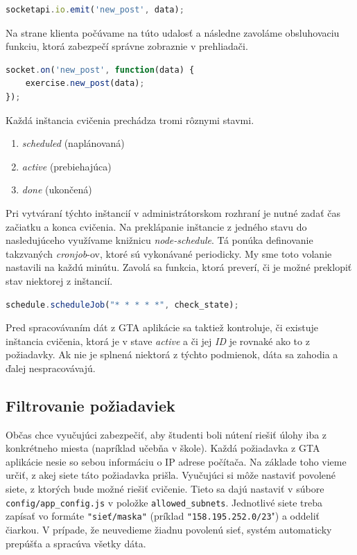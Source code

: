 \begin{lstlisting}[language=JavaScript]
socketapi.io.emit('new_post', data);
\end{lstlisting}

Na strane klienta počúvame na túto udalosť a následne zavoláme obsluhovaciu
funkciu, ktorá zabezpečí správne zobraznie v prehliadači.

\begin{lstlisting}[language=JavaScript]
socket.on('new_post', function(data) {
    exercise.new_post(data);
});
\end{lstlisting}

Každá inštancia cvičenia prechádza tromi rôznymi stavmi.
\begin{enumerate}
	\item \textit{scheduled} (naplánovaná)
	\item \textit{active} (prebiehajúca)
	\item \textit{done} (ukončená)
\end{enumerate}

Pri vytváraní týchto inštancií v administrátorskom rozhraní je nutné zadať
čas začiatku a konca cvičenia. Na preklápanie inštancie z jedného stavu do nasledujúceho
využívame knižnicu \textit{node-schedule}. Tá ponúka definovanie takzvaných
\textit{cronjob}-ov, ktoré sú vykonávané periodicky. My sme toto volanie nastavili
na každú minútu. Zavolá sa funkcia, ktorá preverí, či je možné preklopiť stav
niektorej z inštancií.

\begin{lstlisting}[language=JavaScript]
schedule.scheduleJob("* * * * *", check_state);
\end{lstlisting}

Pred spracovávaním dát z GTA aplikácie sa taktiež kontroluje, či existuje inštancia
cvičenia, ktorá je v stave \textit{active} a či jej \textit{ID} je rovnaké
ako to z požiadavky. Ak nie je splnená niektorá z týchto podmienok, dáta sa
zahodia a ďalej nespracovávajú.

\subsection{Filtrovanie požiadaviek}
\label{sec:gtadataprocessing:ipfilter}

Občas chce vyučujúci zabezpečiť, aby študenti boli nútení riešiť úlohy
iba z konkrétneho miesta (napríklad učebňa v škole). Každá požiadavka z GTA aplikácie
nesie so sebou informáciu o IP adrese počítača. Na základe toho vieme určiť,
z akej siete táto požiadavka prišla. Vyučujúci si môže nastaviť povolené siete,
z ktorých bude možné riešiť cvičenie. Tieto sa dajú nastaviť v súbore
\verb'config/app_config.js' v položke \verb'allowed_subnets'.
Jednotlivé siete treba zapísať vo formáte \verb'"sieť/maska"'
(príklad \verb'"158.195.252.0/23'") a oddeliť čiarkou.
V prípade, že neuvedieme žiadnu povolenú sieť, systém automaticky prepúšťa
a spracúva všetky dáta.

